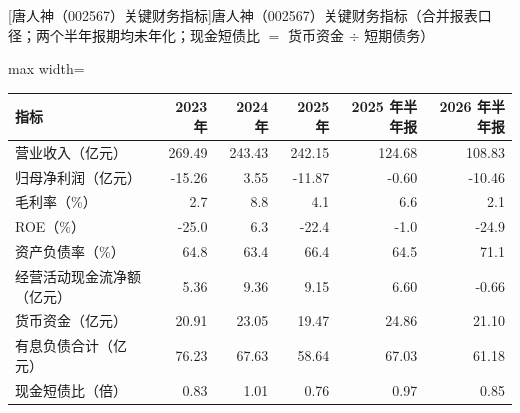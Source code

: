 \begin{center}\small\setlength{\tabcolsep}{3.4pt}
[唐人神（002567）关键财务指标]{唐人神（002567）关键财务指标（合并报表口径；两个半年报期均未年化；现金短债比 $=$ 货币资金 $\div$ 短期债务）}
\begin{adjustbox}{max width=\textwidth}
\begin{tabular}{@{}lrrrrr@{}}
\toprule
指标 & 2023 年 & 2024 年 & 2025 年 & 2025 年半年报 & 2026 年半年报 \\
\midrule
营业收入（亿元） & 269.49 & 243.43 & 242.15 & 124.68 & 108.83 \\
归母净利润（亿元） & -15.26 & 3.55 & -11.87 & -0.60 & -10.46 \\
毛利率（\%） & 2.7 & 8.8 & 4.1 & 6.6 & 2.1 \\
ROE（\%） & -25.0 & 6.3 & -22.4 & -1.0 & -24.9 \\
资产负债率（\%） & 64.8 & 63.4 & 66.4 & 64.5 & 71.1 \\
经营活动现金流净额（亿元） & 5.36 & 9.36 & 9.15 & 6.60 & -0.66 \\
货币资金（亿元） & 20.91 & 23.05 & 19.47 & 24.86 & 21.10 \\
有息负债合计（亿元） & 76.23 & 67.63 & 58.64 & 67.03 & 61.18 \\
现金短债比（倍） & 0.83 & 1.01 & 0.76 & 0.97 & 0.85 \\
\bottomrule
\end{tabular}
\end{adjustbox}
\end{center}

